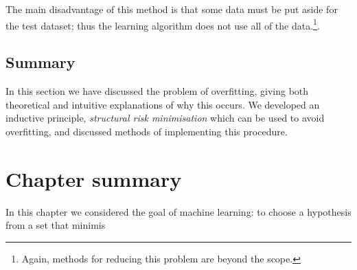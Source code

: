 The main disadvantage of this method is that some data must be put
aside for the test dataset; thus the learning algorithm does not use
all of the data.\footnote{Again, methods for reducing this problem are
beyond the scope.}.

\subsection{Summary}

In this section we have discussed the problem of overfitting, giving
both theoretical and intuitive explanations of why this occurs.  We
developed an inductive principle, \emph{structural risk minimisation}
which can be used to avoid overfitting, and discussed methods of
implementing this procedure.

\section{Chapter summary}

In this chapter we considered the goal of machine learning: to choose
a hypothesis from a set that minimis